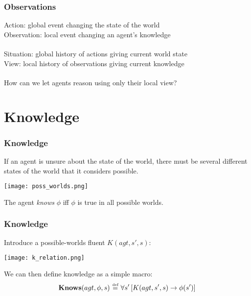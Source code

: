 \documentclass{beamer}
\newcommand{\isdef}{\hbox{$\stackrel{\mbox{\tiny def}}{=}$}}
\begin{document}
\begin{frame}
\frametitle{Observations}
Action:  global event changing the state of the world\\
Observation:  local event changing an agent's knowledge
\ \\
\ \\
Situation:  global history of actions giving current world state\\
View:  local history of observations giving current knowledge
\ \\
\ \\
\pause
How can we let agents reason using only their local view?
\end{frame}

\section{Knowledge}

\begin{frame}
\frametitle{Knowledge}
If an agent is unsure about the state of the world, there must be several
different states of the world that it considers possible.

\begin{center}
  \texttt{[image: poss\_worlds.png]}
\end{center}

The agent \emph{knows} $\phi$ iff $\phi$ is true in all possible worlds.
\end{frame}

\begin{frame}
\frametitle{Knowledge}
Introduce a possible-worlds fluent $K(agt,s',s)$:

\begin{center}
  \texttt{[image: k\_relation.png]}
\end{center}

We can then define knowledge as a simple macro:
\[ \mathbf{Knows}(agt,\phi,s)\ \isdef\ \forall s'\left[K(agt,s',s)\rightarrow \phi(s')\right] \]
\end{frame}
\end{document}
